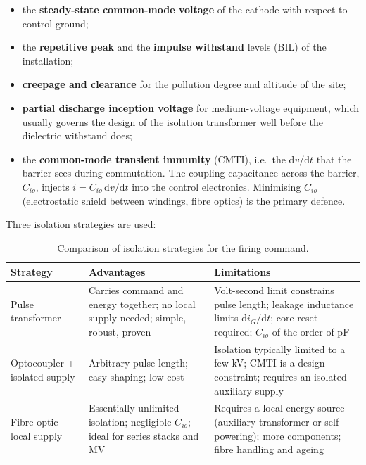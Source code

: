\documentclass[11pt,a4paper]{article}
\begin{document}
\begin{itemize}
  \item the \textbf{steady-state common-mode voltage} of the cathode with respect
        to control ground;
  \item the \textbf{repetitive peak} and the \textbf{impulse withstand} levels
        (BIL) of the installation;
  \item \textbf{creepage and clearance} for the pollution degree and altitude of
        the site;
  \item \textbf{partial discharge inception voltage} for medium-voltage equipment,
        which usually governs the design of the isolation transformer well before
        the dielectric withstand does;
  \item the \textbf{common-mode transient immunity} (CMTI), i.e.\ the
        $\mathrm{d}v/\mathrm{d}t$ that the barrier sees during commutation. The
        coupling capacitance across the barrier, $C_{io}$, injects
        $i = C_{io}\,\mathrm{d}v/\mathrm{d}t$ into the control electronics.
        Minimising $C_{io}$ (electrostatic shield between windings, fibre optics)
        is the primary defence.
\end{itemize}

Three isolation strategies are used:

\begin{table}[htbp]
\centering
\caption{Comparison of isolation strategies for the firing command.}
\label{tab:iso}
\begin{tabular}{@{}p{3.1cm}p{4.6cm}p{4.6cm}@{}}
\toprule
\textbf{Strategy} & \textbf{Advantages} & \textbf{Limitations} \\
\midrule
Pulse transformer &
  Carries command and energy together; no local supply needed; simple, robust,
  proven &
  Volt-second limit constrains pulse length; leakage inductance limits
  $\mathrm{d}i_G/\mathrm{d}t$; core reset required; $C_{io}$ of the order of
  \si{\pico\farad} \\
\addlinespace
Optocoupler + isolated supply &
  Arbitrary pulse length; easy shaping; low cost &
  Isolation typically limited to a few \si{\kilo\volt}; CMTI is a design
  constraint; requires an isolated auxiliary supply \\
\addlinespace
Fibre optic + local supply &
  Essentially unlimited isolation; negligible $C_{io}$; ideal for series stacks
  and MV &
  Requires a local energy source (auxiliary transformer or self-powering);
  more components; fibre handling and ageing \\
\bottomrule
\end{tabular}
\end{table}
\end{document}

